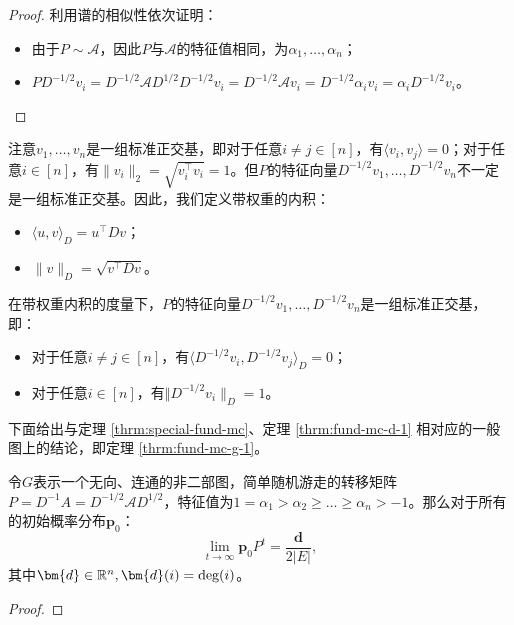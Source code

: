 \documentclass[lang=cn,newtx,10pt,scheme=chinese,chinesefont=nofont,citestyle=gb7714-2015, bibstyle=gb7714-2015]{elegantbook}
\begin{document}
\begin{refsection}
\begin{proof}
    利用谱的相似性依次证明：
    \begin{itemize}
        \item 由于$P\sim \mathcal{A}$，因此$P$与$\mathcal{A}$的特征值相同，为$\alpha_1,\dots,\alpha_n$；
        \item $PD^{-1/2}v_i=D^{-1/2}\mathcal{A}D^{1/2}D^{-1/2}v_i=D^{-1/2}\mathcal{A}v_i=D^{-1/2}\alpha_iv_i=\alpha_iD^{-1/2}v_i$。
    \end{itemize}
\end{proof}

注意$v_1,\dots,v_n$是一组标准正交基，即对于任意$i\ne j\in[n]$，有$\langle v_i,v_j\rangle=0$；对于任意$i\in[n]$，有$\lVert v_i\rVert_2=\sqrt{v_i^{\top}v_i} =1$。但$P$的特征向量$D^{-1/2}v_1,\dots,D^{-1/2}v_n$不一定是一组标准正交基。因此，我们定义带权重的内积：
\begin{itemize}
    \item $\langle u,v\rangle_{D}=u^{\top}Dv$；
    \item $\lVert v\rVert_{D}=\sqrt{v^{\top}Dv}$。
\end{itemize}

在带权重内积的度量下，$P$的特征向量$D^{-1/2}v_1,\dots,D^{-1/2}v_n$是一组标准正交基，即：
\begin{itemize}
    \item 对于任意$i\ne j\in[n]$，有$\langle D^{-1/2}v_i,D^{-1/2}v_j\rangle_D=0$；
    \item 对于任意$i\in[n]$，有$\Vert D^{-1/2}v_i\rVert_D =1$。
\end{itemize}

\vspace{0.25cm}
下面给出与定理 \ref{thrm:special-fund-mc}、定理 \ref{thrm:fund-mc-d-1} 相对应的一般图上的结论，即定理 \ref{thrm:fund-mc-g-1}。
            
\begin{theorem}
    \label{thrm:fund-mc-g-1}
    令$G$表示一个无向、连通的非二部图，简单随机游走的转移矩阵$P=D^{-1}A=D^{-1/2}\mathcal{A}D^{1/2}$，特征值为$1=\alpha_1>\alpha_2\ge\dots \ge \alpha_n> -1$。那么对于所有的初始概率分布$\bm{p}_0$：
    \[
        \lim_{t \to \infty} \bm{p}_0P^t  = \frac{\bm{d}}{2|E|},
    \]
    其中$\bm{d}\in \mathbb{R}^n,\bm{d}(i)=\textup{deg}(i)$。
\end{theorem}
                
\begin{proof}
                    

\end{proof}
\end{refsection}
\end{document}
